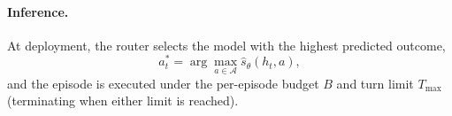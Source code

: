 \paragraph{Inference.}
At deployment, the router selects the model with the highest predicted outcome,
\begin{equation}
a_t^* = \arg\max_{a \in \mathcal{A}} \hat{s}_\theta(h_t, a),
\end{equation}
and the episode is executed under the per-episode budget $B$ and turn limit $T_{\max}$ (terminating when either limit is reached).
